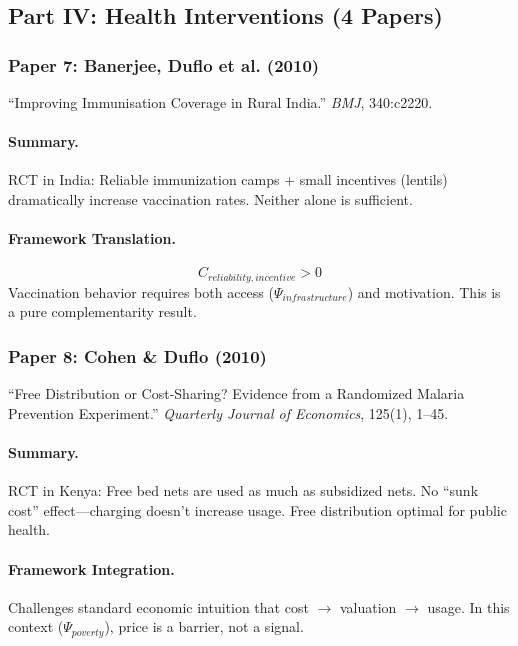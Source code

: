 \subsection{Part IV: Health Interventions (4 Papers)}

\subsubsection{Paper 7: Banerjee, Duflo et al. (2010)}

``Improving Immunisation Coverage in Rural India.''
\textit{BMJ}, 340:c2220.

\paragraph{Summary.}
RCT in India: Reliable immunization camps + small incentives (lentils) dramatically
increase vaccination rates. Neither alone is sufficient.

\paragraph{Framework Translation.}
\begin{equation}
  C_{reliability, incentive} > 0
\end{equation}
Vaccination behavior requires both access ($\Psi_{infrastructure}$) and motivation.
This is a pure complementarity result.

\subsubsection{Paper 8: Cohen \& Duflo (2010)}

``Free Distribution or Cost-Sharing? Evidence from a Randomized Malaria Prevention Experiment.''
\textit{Quarterly Journal of Economics}, 125(1), 1--45.

\paragraph{Summary.}
RCT in Kenya: Free bed nets are used as much as subsidized nets. No ``sunk cost''
effect---charging doesn't increase usage. Free distribution optimal for public health.

\paragraph{Framework Integration.}
Challenges standard economic intuition that cost $\rightarrow$ valuation $\rightarrow$ usage.
In this context ($\Psi_{poverty}$), price is a barrier, not a signal.


